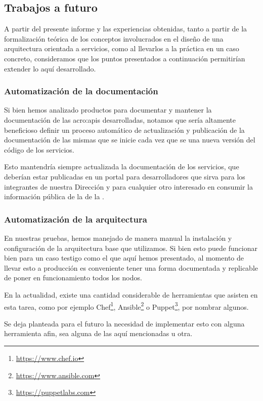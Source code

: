 \subsection{Trabajos a futuro}
\label{trabajos-a-futuro}

A partir del presente informe y las experiencias obtenidas, tanto a partir de la formalización teórica de los conceptos involucrados en el diseño de una arquitectura orientada a servicios, como al llevarlos a la práctica en un caso concreto, consideramos que los puntos presentados a continuación permitirían extender lo aquí desarrollado.

\subsubsection{Automatización de la documentación}

Si bien hemos analizado productos para documentar y mantener la documentación de las \glspl{acro:api} desarrolladas, notamos que sería altamente beneficioso definir un proceso automático de actualización y publicación de la documentación de las mismas que se inicie cada vez que se  una nueva versión del código de los servicios.

Esto mantendría siempre actualizada la documentación de los servicios, que deberían estar publicadas en un portal para desarrolladores que sirva para los integrantes de nuestra Dirección y para cualquier otro interesado en consumir la información pública de la {\cloud} de la {\unlp}.

\subsubsection{Automatización de la arquitectura}

En nuestras pruebas, hemos manejado de manera manual la instalación y configuración de la arquitectura base que utilizamos. Si bien esto puede funcionar bien para un caso testigo como el que aquí hemos presentado, al momento de llevar esto a producción es conveniente tener una forma documentada y replicable de poner en funcionamiento todos los nodos.

En la actualidad, existe una cantidad considerable de herramientas que asisten en esta tarea, como por ejemplo Chef\footnote{\url{https://www.chef.io}}, Ansible\footnote{\url{https://www.ansible.com}} o Puppet\footnote{\url{https://puppetlabs.com}}, por nombrar algunos.

Se deja planteada para el futuro la necesidad de implementar esto con alguna herramienta afin, sea alguna de las aquí mencionadas u otra.

